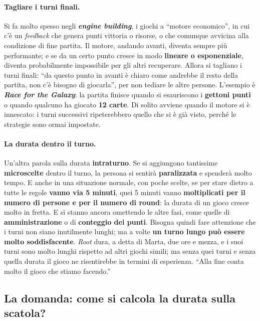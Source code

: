 \paragraph{Tagliare i turni finali.} Si fa molto spesso negli \textbf{\emph{engine
building}}, i giochi a ``motore economico'', in cui c'è un \emph{feedback} che genera punti
vittoria o risorse, o che comunque avvicina alla condizione di fine partita. Il motore, andando
avanti, diventa sempre più performante; e se da un certo punto cresce in modo
\textbf{lineare o esponenziale}, diventa probabilmente impossibile per gli altri recuperare.
Allora si tagliano i turni finali: ``da questo punto in avanti è chiaro come andrebbe il resto
della partita, non c'è bisogno di giocarla'', per non tediare le altre persone. L'esempio è
\textbf{\emph{Race for the Galaxy}}: la partita finisce quando si esauriscono i
\textbf{gettoni punti} o quando qualcuno ha giocato \textbf{12 carte}. Di solito avviene quando
il motore si è innescato: i turni successivi ripeterebbero quello che si è già visto, perché
le strategie sono ormai impostate.

\paragraph{La durata dentro il turno.} Un'altra parola sulla durata \textbf{intraturno}. Se si
aggiungono tantissime \textbf{microscelte} dentro il turno, la persona si sentirà
\textbf{paralizzata} e spenderà molto tempo. E anche in una situazione normale, con poche
scelte, se per stare dietro a tutte le regole \textbf{vanno via 5 minuti}, quei 5 minuti vanno
\textbf{moltiplicati per il numero di persone e per il numero di round}: la durata di un gioco
cresce molto in fretta. E si stanno ancora omettendo le altre fasi, come quelle di
\textbf{amministrazione} o di \textbf{conteggio dei punti}. Bisogna quindi fare attenzione che
i turni non siano inutilmente lunghi; ma a volte \textbf{un turno lungo può essere molto
soddisfacente}. \emph{Root} dura, a detta di Marta, due ore e mezza, e i suoi turni sono molto
lunghi rispetto ad altri giochi simili; ma senza quei turni e senza quella durata il gioco ne
risentirebbe in termini di esperienza. ``Alla fine conta molto il gioco che stiamo facendo.''

\subsection{La domanda: come si calcola la durata sulla scatola?}

